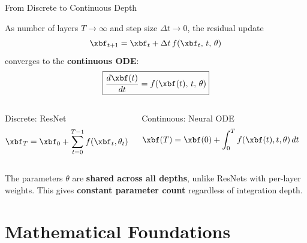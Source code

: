 \documentclass[aspectratio=169,xcolor=dvipsnames,svgnames,x11names,fleqn]{beamer}
\begin{document}
\begin{frame}{From Discrete to Continuous Depth}

\scriptsize

\begin{tblockFrost}{}
As number of layers $T \to \infty$ and step size $\Delta t \to 0$, the residual update
$$
  \xbf_{t+1} = \xbf_t + \Delta t\, f(\xbf_t,\, t,\, \theta)
$$
converges to the \textbf{continuous ODE}:
$$
  \boxed{\frac{d\xbf(t)}{dt} = f\!\left(\xbf(t),\, t,\, \theta\right)}
$$
\end{tblockFrost}
\begin{columns}
\begin{block}{Discrete: ResNet}
$$
  \xbf_T = \xbf_0 + \sum_{t=0}^{T-1} f(\xbf_t, \theta_t)
$$
\end{block}
\begin{block}{Continuous: Neural ODE}
$$
  \xbf(T) = \xbf(0) + \int_0^T f\!\left(\xbf(t), t, \theta\right) dt
$$
\end{block}
\end{columns}
\vspace{6pt}
\begin{alertblock}{}
The parameters $\theta$ are \textbf{shared across all depths}, unlike ResNets with per-layer weights. This gives \textbf{constant parameter count} regardless of integration depth.
\end{alertblock}
\end{frame}

 
\section{Mathematical Foundations}
 
\end{document}
